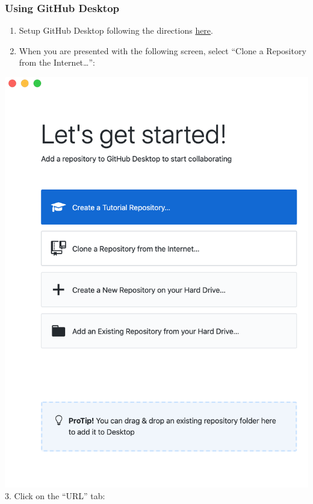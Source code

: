 \documentclass[]{book}
\providecommand{\tightlist}{%
  \setlength{\itemsep}{0pt}\setlength{\parskip}{0pt}}
\begin{document}
\subsubsection{Using GitHub Desktop}\label{using-github-desktop}

\begin{enumerate}
\def\labelenumi{\arabic{enumi}.}
\tightlist
\item
  Setup GitHub Desktop following the directions
  \protect\hyperlink{github-desktop-install}{here}.
\item
  When you are presented with the following screen, select ``Clone a
  Repository from the Internet\ldots{}'':
\end{enumerate}

\includegraphics{./images/gh-desktop-03.png} 3. Click on the ``URL''
tab:
\end{document}
